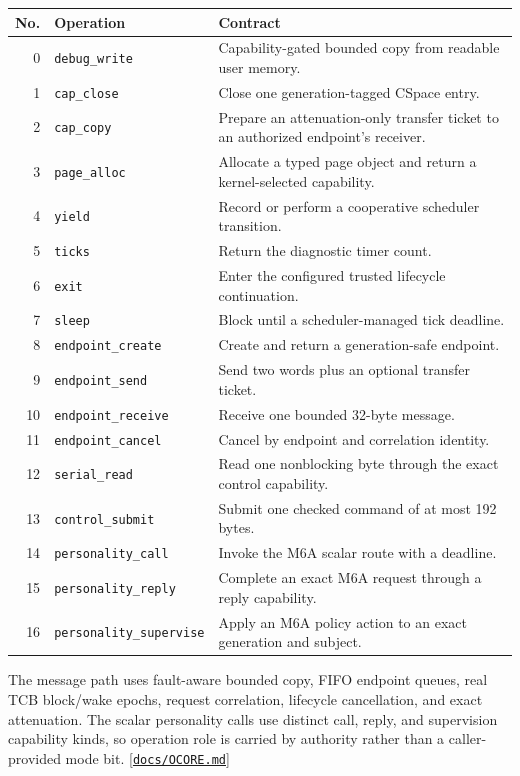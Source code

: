 \documentclass[11pt,oneside]{article}
\newcommand{\src}[1]{\textcolor{OSlate}{\scriptsize[\href{https://github.com/lostadi/OSTADIX/blob/c0b02c326b2329a95ba52447c7180bc93957cd57/#1}{\nolinkurl{#1}}]}\allowbreak}
\begin{document}
\begin{longtable}{r P{0.28\textwidth} P{0.56\textwidth}}
\toprule
\textbf{No.} & \textbf{Operation} & \textbf{Contract} \\
\midrule
{} & \texttt{debug\_write} & Capability-gated bounded copy from readable user memory. \\
1 & \texttt{cap\_close} & Close one generation-tagged CSpace entry. \\
2 & \texttt{cap\_copy} & Prepare an attenuation-only transfer ticket to an authorized endpoint's receiver. \\
3 & \texttt{page\_alloc} & Allocate a typed page object and return a kernel-selected capability. \\
4 & \texttt{yield} & Record or perform a cooperative scheduler transition. \\
5 & \texttt{ticks} & Return the diagnostic timer count. \\
6 & \texttt{exit} & Enter the configured trusted lifecycle continuation. \\
7 & \texttt{sleep} & Block until a scheduler-managed tick deadline. \\
8 & \texttt{endpoint\_create} & Create and return a generation-safe endpoint. \\
9 & \texttt{endpoint\_send} & Send two words plus an optional transfer ticket. \\
10 & \texttt{endpoint\_receive} & Receive one bounded 32-byte message. \\
11 & \texttt{endpoint\_cancel} & Cancel by endpoint and correlation identity. \\
12 & \texttt{serial\_read} & Read one nonblocking byte through the exact control capability. \\
13 & \texttt{control\_submit} & Submit one checked command of at most 192 bytes. \\
14 & \texttt{personality\_call} & Invoke the M6A scalar route with a deadline. \\
15 & \texttt{personality\_reply} & Complete an exact M6A request through a reply capability. \\
16 & \texttt{personality\_supervise} & Apply an M6A policy action to an exact generation and subject. \\
\bottomrule
\end{longtable}

The message path uses fault-aware bounded copy, FIFO endpoint queues, real TCB
block/wake epochs, request correlation, lifecycle cancellation, and exact
attenuation. The scalar personality calls use distinct call, reply, and
supervision capability kinds, so operation role is carried by authority rather
than a caller-provided mode bit. \src{docs/OCORE.md}
\end{document}
